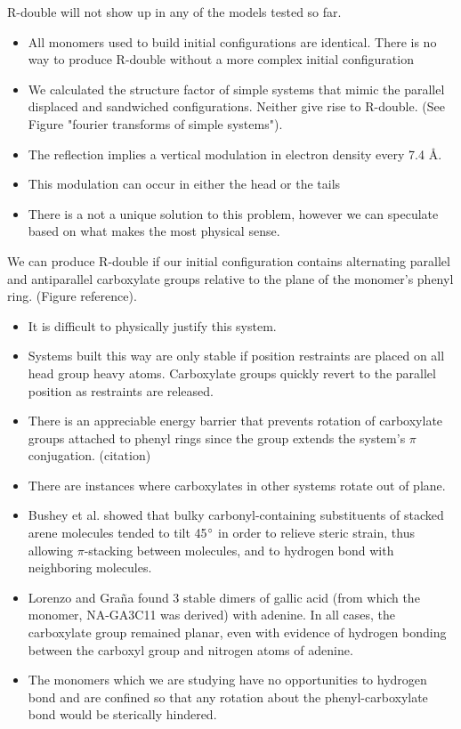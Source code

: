 \documentclass{article}
\begin{document}
  R-double will not show up in any of the models tested so far.
  \begin{itemize}
        \item All monomers used to build initial configurations are identical. There is no way 	
        to produce R-double without a more complex initial configuration 
        \item We calculated the structure factor of simple systems that mimic the parallel
        displaced and sandwiched configurations. Neither give rise to R-double.
        (See Figure "fourier transforms of simple systems").
        \item The reflection implies a vertical modulation in electron density every 7.4 \AA.                
        \item This modulation can occur in either the head or the tails
        \item There is a not a unique solution to this problem, however we can speculate based
        on what makes the most physical sense.
  \end{itemize}
  
  We can produce R-double if our initial configuration contains alternating parallel and
  antiparallel carboxylate groups relative to the plane of the monomer's phenyl ring.
  (Figure reference).  
  \begin{itemize}
  		\item It is difficult to physically justify this system. 
  		\item Systems built this way are only stable if position restraints are placed on 
  		all head group heavy atoms. Carboxylate groups quickly revert to the parallel
  		position as restraints are released.
  		\item There is an appreciable energy barrier that prevents rotation
  		of carboxylate groups attached to phenyl rings since the group extends the system's 
  		$\pi$ conjugation. (citation)
  		\item There are instances where carboxylates in other systems rotate out of plane.
  		\item Bushey et al. showed that bulky carbonyl-containing substituents of stacked arene
  		molecules tended to tilt 45$\degree$ in order to relieve steric strain, thus allowing 
  		$\pi$-stacking between molecules, and to hydrogen bond with neighboring molecules. 
  		\item Lorenzo and Gra\~{n}a found 3 stable dimers of gallic acid (from which the 
  		monomer, NA-GA3C11 was derived) with adenine. In all cases, the carboxylate group 
  		remained planar, even with evidence of hydrogen bonding between the carboxyl group
  		and nitrogen atoms of adenine. 
  		\item The monomers which we are studying have no opportunities to hydrogen bond and 
  		are confined so that any rotation about the phenyl-carboxylate bond would be sterically
  		hindered. 
  \end{itemize}
  
\end{document}
